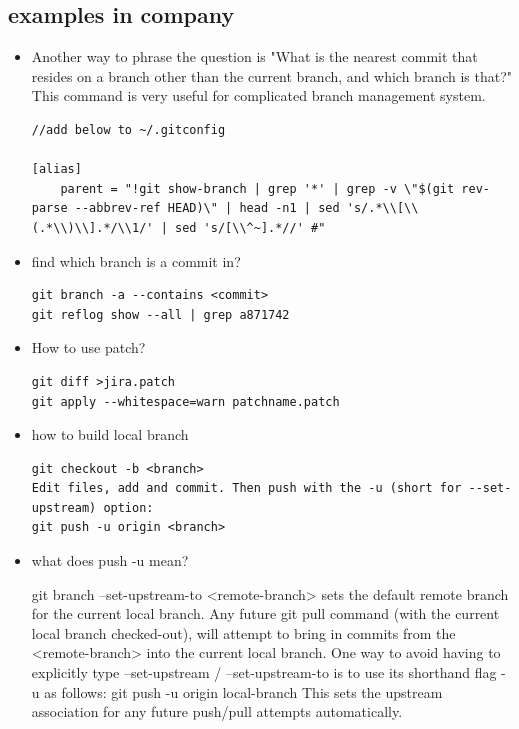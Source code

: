 \documentclass[a4paper,11pt,twoside]{book}
\begin{document}
\subsection{examples in company}


\begin{itemize}
	
	\item Another way to phrase the question is "What is the nearest commit that resides on a branch other than the current branch, and which branch is that?" This command is very useful for complicated branch management system. 
	
\begin{lstlisting}[mathescape = false] 
//add below to ~/.gitconfig	
	
[alias]
	parent = "!git show-branch | grep '*' | grep -v \"$(git rev-parse --abbrev-ref HEAD)\" | head -n1 | sed 's/.*\\[\\(.*\\)\\].*/\\1/' | sed 's/[\\^~].*//' #"
\end{lstlisting}
	
	\item find which branch is a commit in? 
\begin{lstlisting}
git branch -a --contains <commit>
git reflog show --all | grep a871742
\end{lstlisting}	
	
	\item How to use patch? 
\begin{lstlisting}
git diff >jira.patch
git apply --whitespace=warn patchname.patch 
\end{lstlisting}
	
	\item how to build local branch
\begin{lstlisting}
git checkout -b <branch>
Edit files, add and commit. Then push with the -u (short for --set-upstream) option:
git push -u origin <branch>
\end{lstlisting}

	\item  what does push -u mean? 

git branch --set-upstream-to <remote-branch>
sets the default remote branch for the current local branch.
Any future git pull command (with the current local branch checked-out),
will attempt to bring in commits from the <remote-branch> into the current local branch.
One way to avoid having to explicitly type --set-upstream / --set-upstream-to is to use its shorthand flag -u as follows:
git push -u origin local-branch
This sets the upstream association for any future push/pull attempts automatically.



\end{itemize}
\end{document}

